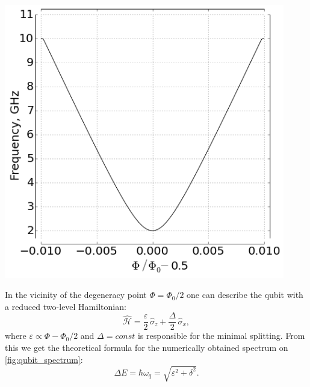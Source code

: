 \documentclass[a0, portrait]{a0poster}
\begin{document}
\begin{multicols}{2}
\begin{tcolorbox}[left=1cm, right=1cm, top=0.5cm, bottom=0.5cm, 
                  title={\Large Flux qubit}, bottomtitle=.3cm, toptitle=.5cm
                  ]
\begin{minipage}{0.5\textwidth}
\centering
\includegraphics[height=12cm]{Pictures/spectrum_hyp}
\label{fig:qubit_spectrum}
\end{minipage}
\begin{minipage}{0.5\textwidth}
In the vicinity of the degeneracy point $\Phi = \Phi_0/2$ one can describe the qubit with a reduced two-level Hamiltonian:
\begin{equation}
\mathcal{\hat H} = \frac{\varepsilon}{2}\,\hat \sigma_z + \frac{\Delta}{2}\,\hat \sigma_x,
\label{eq:red_ham}
\end{equation}
where $\varepsilon \propto \Phi-\Phi_0/2$ and $\Delta = const$ is responsible for the minimal splitting. From this we get the theoretical formula for the numerically obtained spectrum on \autoref{fig:qubit_spectrum}:
\begin{equation}
\Delta E = \hbar \omega_q = \sqrt{\varepsilon^2+\delta^2}.
\end{equation}
\end{minipage}\\
\end{tcolorbox}


\end{multicols}
\end{document}
